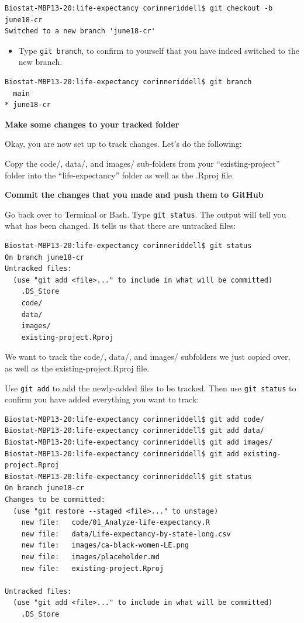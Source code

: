 \documentclass[
]{book}
\providecommand{\tightlist}{%
  \setlength{\itemsep}{0pt}\setlength{\parskip}{0pt}}
\begin{document}
\begin{verbatim}
Biostat-MBP13-20:life-expectancy corinneriddell$ git checkout -b june18-cr
Switched to a new branch 'june18-cr'
\end{verbatim}

\begin{itemize}
\tightlist
\item
  Type \texttt{git\ branch}, to confirm to yourself that you have indeed switched to
  the new branch.
\end{itemize}

\begin{verbatim}
Biostat-MBP13-20:life-expectancy corinneriddell$ git branch
  main
* june18-cr
\end{verbatim}

\textbf{Make some changes to your tracked folder}

Okay, you are now set up to track changes. Let's do the following:

Copy the code/, data/, and images/ sub-folders from your ``existing-project'' folder into the
``life-expectancy'' folder as well as the .Rproj file.

\textbf{Commit the changes that you made and push them to GitHub}

Go back over to Terminal or Bash. Type \texttt{git\ status}. The output will tell you
what has been changed. It tells us that there are untracked files:

\begin{verbatim}
Biostat-MBP13-20:life-expectancy corinneriddell$ git status
On branch june18-cr
Untracked files:
  (use "git add <file>..." to include in what will be committed)
    .DS_Store
    code/
    data/
    images/
    existing-project.Rproj
\end{verbatim}

We want to track the code/, data/, and images/ subfolders we just copied over, as well as the existing-project.Rproj file.

Use \texttt{git\ add} to add the newly-added files to be tracked. Then use \texttt{git\ status} to confirm you have added everything you want to track:

\begin{verbatim}
Biostat-MBP13-20:life-expectancy corinneriddell$ git add code/
Biostat-MBP13-20:life-expectancy corinneriddell$ git add data/
Biostat-MBP13-20:life-expectancy corinneriddell$ git add images/
Biostat-MBP13-20:life-expectancy corinneriddell$ git add existing-project.Rproj 
Biostat-MBP13-20:life-expectancy corinneriddell$ git status
On branch june18-cr
Changes to be committed:
  (use "git restore --staged <file>..." to unstage)
    new file:   code/01_Analyze-life-expectancy.R
    new file:   data/Life-expectancy-by-state-long.csv
    new file:   images/ca-black-women-LE.png
    new file:   images/placeholder.md
    new file:   existing-project.Rproj

Untracked files:
  (use "git add <file>..." to include in what will be committed)
    .DS_Store
\end{verbatim}
\end{document}
